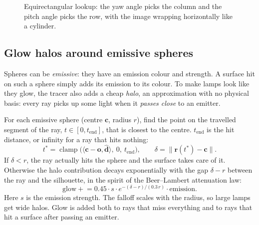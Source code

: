\documentclass[11pt,a4paper]{article}
\newcommand{\vv}[1]{\mathbf{#1}}
\newcommand{\unit}[1]{\widehat{#1}}
\newcommand{\dotp}[2]{\langle #1, #2\rangle}
\begin{document}
\begin{figure}[h]
\centering
{}
\caption{Equirectangular lookup: the yaw angle picks the column and the pitch
angle picks the row, with the image wrapping horizontally like a cylinder.}
\end{figure}

\subsection{Glow halos around emissive spheres}

Spheres can be \emph{emissive}: they have an emission colour and strength. A
surface hit on such a sphere simply adds its emission to its colour. To make
lamps look like they glow, the tracer also adds a cheap \emph{halo}, an
approximation with no physical basis: every ray picks up some light when it
\emph{passes close} to an emitter.

For each emissive sphere (centre $\vv c$, radius $r$), find the point on the
travelled segment of the ray, $t\in[0,t_{\text{end}}]$, that is closest to the
centre. $t_{\text{end}}$ is the hit distance, or infinity for a ray that hits
nothing:
\[
  t^\ast = \operatorname{clamp}\big(\dotp{\vv c-\vv o}{\unit{\vv d}},\ 0,\ t_{\text{end}}\big),
  \qquad \delta = \lVert \vv r(t^\ast)-\vv c\rVert .
\]
If $\delta<r$, the ray actually hits the sphere and the surface takes care of it.
Otherwise the halo contribution decays exponentially with the gap
$\delta-r$ between the ray and the silhouette, in the spirit of the
Beer--Lambert attenuation law:
\[
  \text{glow} \mathrel{+}= 0.45\cdot s\cdot e^{-(\delta-r)/(0.3\,r)}\cdot \text{emission}.
\]
Here $s$ is the emission strength. The falloff scales with the radius, so large
lamps get wide halos. Glow is added both to rays that miss everything and to
rays that hit a surface after passing an emitter.
\end{document}
